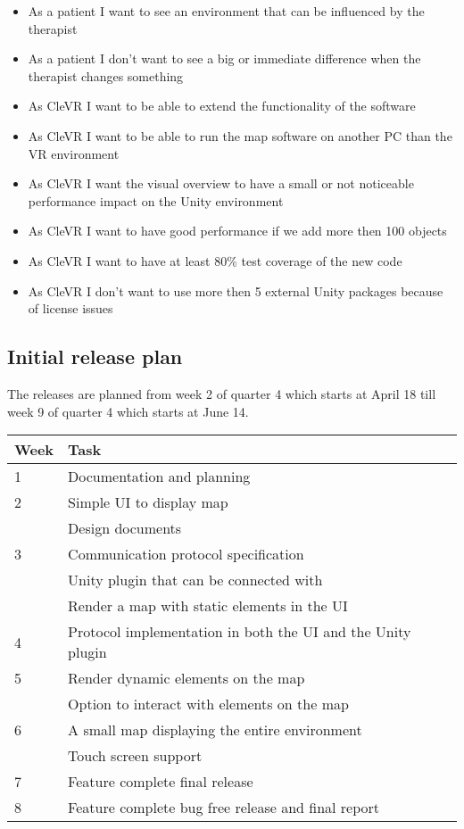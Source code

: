 \documentclass[11pt]{article}
\begin{document}
\begin{itemize}
        \item As a patient I want to see an environment that can be influenced by the therapist
        \item As a patient I don't want to see a big or immediate difference when the therapist changes something
        \item As CleVR I want to be able to extend the functionality of the software
        \item As CleVR I want to be able to run the map software on another PC than the VR environment
        \item As CleVR I want the visual overview to have a small or not noticeable performance impact on the Unity environment
        \item As CleVR I want to have good performance if we add more then 100 objects
        \item As CleVR I want to have at least 80\% test coverage of the new code
        \item As CleVR I don't want to use more then 5 external Unity packages because of license issues
	\end{itemize}
    
    \subsection{Initial release plan}
    The releases are planned from week 2 of quarter 4 which starts at April 18 till week 9 of quarter 4 which starts at June 14.\\[\baselineskip]
    \begin{tabular}{ l l }
		Week & Task \\
        \hline
        1 & Documentation and planning \\
        2 & Simple UI to display map \\
          & Design documents \\
        3 & Communication protocol specification \\
          & Unity plugin that can be connected with \\
          & Render a map with static elements in the UI \\
        4 & Protocol implementation in both the UI and the Unity plugin \\
        5 & Render dynamic elements on the map \\
          & Option to interact with elements on the map \\
        6 & A small map displaying the entire environment \\
          & Touch screen support \\
        7 & Feature complete final release \\
        8 & Feature complete bug free release and final report \\
	\end{tabular}
\end{document}

